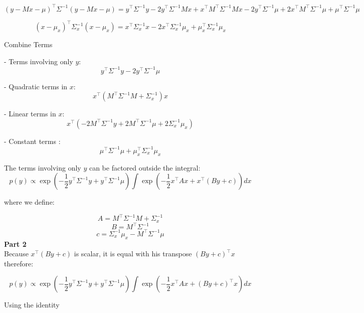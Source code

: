 \documentclass{article}
\begin{document}
   \[
   (y - Mx - \mu)^\top \Sigma^{-1} (y - Mx - \mu) = y^\top \Sigma^{-1} y - 2 y^\top \Sigma^{-1} M x + x^\top M^\top \Sigma^{-1} M x - 2 y^\top \Sigma^{-1} \mu + 2 x^\top M^\top \Sigma^{-1} \mu + \mu^\top \Sigma^{-1} \mu
   \]

   \[
   (x - \mu_x)^\top \Sigma_x^{-1} (x - \mu_x) = x^\top \Sigma_x^{-1} x - 2 x^\top \Sigma_x^{-1} \mu_x + \mu_x^\top \Sigma_x^{-1} \mu_x
   \]

Combine Terms

- Terms involving only \( y \):
  \[
  y^\top \Sigma^{-1} y - 2 y^\top \Sigma^{-1} \mu
  \]

- Quadratic terms in \( x \):
  \[
  x^\top (M^\top \Sigma^{-1} M + \Sigma_x^{-1}) x
  \]

- Linear terms in \( x \):
  \[
  x^\top \left( -2 M^\top \Sigma^{-1} y + 2 M^\top \Sigma^{-1} \mu + 2 \Sigma_x^{-1} \mu_x \right)
  \]

- Constant terms :
  \[
  \mu^\top \Sigma^{-1} \mu + \mu_x^\top \Sigma_x^{-1} \mu_x
  \]

The terms involving only \( y \) can be factored outside the integral:
\[
p(y) \propto \exp \left( -\frac{1}{2} y^\top \Sigma^{-1} y + y^\top \Sigma^{-1} \mu \right) \int \exp \left( -\frac{1}{2} x^\top A x + x^\top (B y + c) \right) dx
\]

where we define:

\[ A = M^\top \Sigma^{-1} M + \Sigma_x^{-1} \]
\[ B = M^\top \Sigma^{-1} \]
\[ c = \Sigma_x^{-1} \mu_x - M^\top \Sigma^{-1} \mu \]
\textbf{Part 2}\\

Because $x^\top (B y + c) $  is scalar, it is equal with his transpose $(B y + c)^\top x$  therefore:

\[
p(y) \propto \exp \left( -\frac{1}{2} y^\top \Sigma^{-1} y + y^\top \Sigma^{-1} \mu \right) \int \exp \left( -\frac{1}{2} x^\top A x +  (B y + c)^\top x \right) dx
\]

Using the identity 
\end{document}
